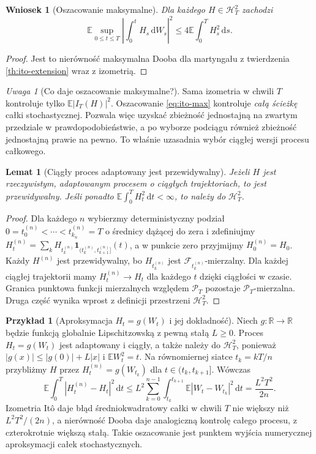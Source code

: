 \documentclass[11pt,a4paper,oneside]{report}
\numberwithin{equation}{chapter}
\theoremstyle{plain}
\newtheorem{lemat}[twierdzenie]{Lemat}
\newtheorem{wniosek}[twierdzenie]{Wniosek}
\theoremstyle{definition}
\newtheorem{przyklad}{Przykład}[chapter]
\theoremstyle{remark}
\newtheorem{uwaga}{Uwaga}[chapter]
\newcommand{\R}{\mathbb{R}}
\newcommand{\E}{\mathbb{E}}
\newcommand{\calF}{\mathcal{F}}
\newcommand{\calH}{\mathcal{H}}
\newcommand{\calP}{\mathcal{P}}
\newcommand{\ind}[1]{\mathbf{1}_{#1}}
\newcommand{\dd}{\mathrm{d}}
\begin{document}
\begin{wniosek}[Oszacowanie maksymalne]
Dla każdego $H\in\calH_T^2$ zachodzi
\[
\E\sup_{0\le t\le T}\left|\int_0^tH_s\,\dd W_s\right|^2
\le4\E\int_0^TH_s^2\,\dd s.
\tag{2.9}\label{eq:ito-max}
\]
\end{wniosek}
\begin{proof}
Jest to nierówność maksymalna Dooba dla martyngału
z twierdzenia \ref{th:ito-extension} wraz z izometrią.
\end{proof}

\begin{uwaga}[Co daje oszacowanie maksymalne?]
Sama izometria w chwili $T$ kontroluje tylko
$\E|I_T(H)|^2$. Oszacowanie \eqref{eq:ito-max}
kontroluje \emph{całą ścieżkę} całki stochastycznej.
Pozwala więc uzyskać zbieżność jednostajną na zwartym
przedziale w prawdopodobieństwie, a po wyborze podciągu
również zbieżność jednostajną prawie na pewno. To właśnie
uzasadnia wybór ciągłej wersji procesu całkowego.
\end{uwaga}


\begin{lemat}[Ciągły proces adaptowany jest przewidywalny]
Jeżeli $H$ jest rzeczywistym, adaptowanym procesem
o ciągłych trajektoriach, to jest przewidywalny.
Jeśli ponadto $\E\int_0^TH_t^2\,\dd t<\infty$,
to należy do $\calH_T^2$.
\end{lemat}
\begin{proof}
Dla każdego $n$ wybierzmy deterministyczny podział
$0=t_0^{(n)}<\cdots<t_{k_n}^{(n)}=T$ o średnicy
dążącej do zera i zdefiniujmy
$H_t^{(n)}=\sum_k H_{t_k^{(n)}}
\ind{(t_k^{(n)},t_{k+1}^{(n)}]}(t)$,
a w punkcie zero przyjmijmy $H_0^{(n)}=H_0$.
Każdy $H^{(n)}$ jest przewidywalny, bo
$H_{t_k^{(n)}}$ jest $\calF_{t_k^{(n)}}$-mierzalny.
Dla każdej ciągłej trajektorii mamy
$H_t^{(n)}\to H_t$ dla każdego $t$ dzięki
ciągłości w czasie. Granica punktowa funkcji
mierzalnych względem $\calP_T$ pozostaje
$\calP_T$-mierzalna. Druga część wynika wprost
z definicji przestrzeni $\calH_T^2$.
\end{proof}

\begin{przyklad}[Aproksymacja $H_t=g(W_t)$ i jej dokładność]
Niech $g:\R\to\R$ będzie funkcją globalnie Lipschitzowską
z pewną stałą $L\ge0$. Proces $H_t=g(W_t)$ jest
adaptowany i ciągły, a także należy do $\calH_T^2$,
ponieważ $|g(x)|\le|g(0)|+L|x|$ i
$\E W_t^2=t$. Na równomiernej siatce $t_k=kT/n$
przybliżmy $H$ przez
$H_t^{(n)}=g(W_{t_k})$ dla $t\in(t_k,t_{k+1}]$.
Wówczas
\[
\E\int_0^T|H_t^{(n)}-H_t|^2\,\dd t
\le L^2\sum_{k=0}^{n-1}\int_{t_k}^{t_{k+1}}
\E|W_t-W_{t_k}|^2\,\dd t
=\frac{L^2T^2}{2n}.
\]
Izometria Itô daje błąd średniokwadratowy całki
w chwili $T$ nie większy niż $L^2T^2/(2n)$,
a nierówność Dooba daje analogiczną kontrolę
całego procesu, z czterokrotnie większą stałą.
Takie oszacowanie jest punktem wyjścia
numerycznej aproksymacji całek stochastycznych.
\end{przyklad}
\end{document}
